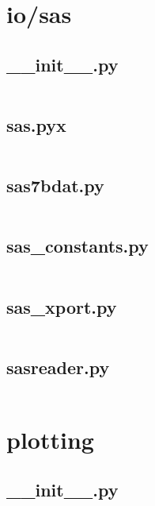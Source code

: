 \documentclass{article}
\begin{document}
\section{io/sas}

\subsection{\_\_init\_\_.py}
\inputminted{python}{/home/dufferzafar/dev/@clones/pandas/pandas/io/sas/__init__.py}
\newpage

\subsection{sas.pyx}
\inputminted{cython}{/home/dufferzafar/dev/@clones/pandas/pandas/io/sas/sas.pyx}
\newpage

\subsection{sas7bdat.py}
\inputminted{python}{/home/dufferzafar/dev/@clones/pandas/pandas/io/sas/sas7bdat.py}
\newpage

\subsection{sas\_constants.py}
\inputminted{python}{/home/dufferzafar/dev/@clones/pandas/pandas/io/sas/sas_constants.py}
\newpage

\subsection{sas\_xport.py}
\inputminted{python}{/home/dufferzafar/dev/@clones/pandas/pandas/io/sas/sas_xport.py}
\newpage

\subsection{sasreader.py}
\inputminted{python}{/home/dufferzafar/dev/@clones/pandas/pandas/io/sas/sasreader.py}
\newpage

\section{plotting}

\subsection{\_\_init\_\_.py}
\inputminted{python}{/home/dufferzafar/dev/@clones/pandas/pandas/plotting/__init__.py}
\newpage
\end{document}
